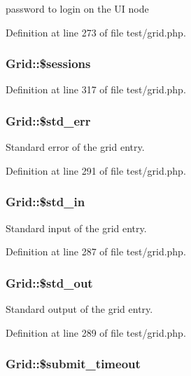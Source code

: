 password to login on the UI node 



Definition at line 273 of file test/grid.php.
\subsubsection{\setlength{\rightskip}{0pt plus 5cm}Grid::\$sessions}\label{classGrid_o12}




Definition at line 317 of file test/grid.php.
\subsubsection{\setlength{\rightskip}{0pt plus 5cm}Grid::\$std\_\-err}\label{classGrid_o9}


Standard error of the grid entry. 



Definition at line 291 of file test/grid.php.
\subsubsection{\setlength{\rightskip}{0pt plus 5cm}Grid::\$std\_\-in}\label{classGrid_o7}


Standard input of the grid entry. 



Definition at line 287 of file test/grid.php.
\subsubsection{\setlength{\rightskip}{0pt plus 5cm}Grid::\$std\_\-out}\label{classGrid_o8}


Standard output of the grid entry. 



Definition at line 289 of file test/grid.php.
\subsubsection{\setlength{\rightskip}{0pt plus 5cm}Grid::\$submit\_\-timeout}\label{classGrid_o14}




